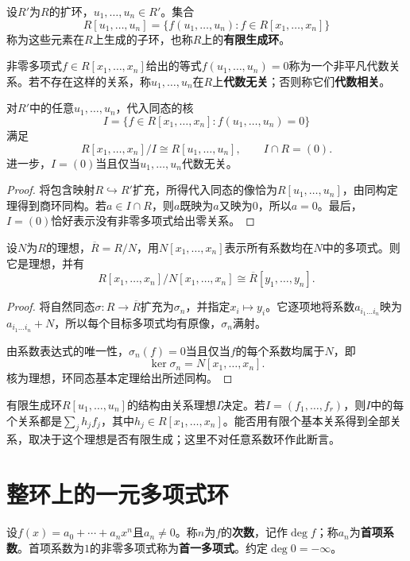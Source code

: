 \begin{definition}
设$R'$为$R$的扩环，$u_1,\ldots,u_n\in R'$。集合
\[
R[u_1,\ldots,u_n]
=\{f(u_1,\ldots,u_n):f\in R[x_1,\ldots,x_n]\}
\]
称为这些元素在$R$上生成的子环，也称$R$上的\textbf{有限生成环}。

非零多项式$f\in R[x_1,\ldots,x_n]$给出的等式$f(u_1,\ldots,u_n)=0$称为一个非平凡代数关系。若不存在这样的关系，称$u_1,\ldots,u_n$在$R$上\textbf{代数无关}；否则称它们\textbf{代数相关}。
\end{definition}

\begin{corollary}
对$R'$中的任意$u_1,\ldots,u_n$，代入同态的核
\[
I=\{f\in R[x_1,\ldots,x_n]:f(u_1,\ldots,u_n)=0\}
\]
满足
\[
R[x_1,\ldots,x_n]/I\cong R[u_1,\ldots,u_n],\qquad I\cap R=(0).
\]
进一步，$I=(0)$当且仅当$u_1,\ldots,u_n$代数无关。
\end{corollary}
\begin{proof}
将包含映射$R\hookrightarrow R'$扩充，所得代入同态的像恰为$R[u_1,\ldots,u_n]$，由同构定理得到商环同构。若$a\in I\cap R$，则$a$既映为$a$又映为$0$，所以$a=0$。最后，$I=(0)$恰好表示没有非零多项式给出零关系。
\end{proof}

\begin{proposition}
设$N$为$R$的理想，$\overline R=R/N$，用$N[x_1,\ldots,x_n]$表示所有系数均在$N$中的多项式。则它是理想，并有
\[
R[x_1,\ldots,x_n]/N[x_1,\ldots,x_n]
\cong\overline R[y_1,\ldots,y_n].
\]
\end{proposition}
\begin{proof}
将自然同态$\sigma:R\to\overline R$扩充为$\sigma_n$，并指定$x_i\mapsto y_i$。它逐项地将系数$a_{i_1\ldots i_n}$映为$a_{i_1\ldots i_n}+N$，所以每个目标多项式均有原像，$\sigma_n$满射。

由系数表达式的唯一性，$\sigma_n(f)=0$当且仅当$f$的每个系数均属于$N$，即
\[
\ker\sigma_n=N[x_1,\ldots,x_n].
\]
核为理想，环同态基本定理给出所述同构。
\end{proof}

有限生成环$R[u_1,\ldots,u_n]$的结构由关系理想$I$决定。若$I=(f_1,\ldots,f_r)$，则$I$中的每个关系都是$\sum_j h_jf_j$，其中$h_j\in R[x_1,\ldots,x_n]$。能否用有限个基本关系得到全部关系，取决于这个理想是否有限生成；这里不对任意系数环作此断言。


\section{整环上的一元多项式环}

\begin{definition}
设$f(x)=a_0+\cdots+a_nx^n$且$a_n\ne0$。称$n$为$f$的\textbf{次数}，记作$\deg f$；称$a_n$为\textbf{首项系数}。首项系数为$1$的非零多项式称为\textbf{首一多项式}。约定$\deg0=-\infty$。
\end{definition}


